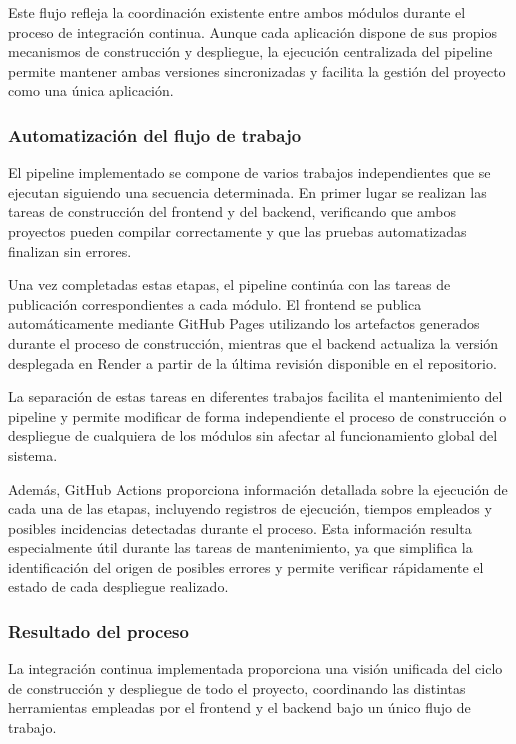 Este flujo refleja la coordinación existente entre ambos módulos durante el proceso de integración continua. Aunque cada aplicación dispone de sus propios mecanismos de construcción y despliegue, la ejecución centralizada del pipeline permite mantener ambas versiones sincronizadas y facilita la gestión del proyecto como una única aplicación.

\subsubsection{Automatización del flujo de trabajo}

El pipeline implementado se compone de varios trabajos independientes que se ejecutan siguiendo una secuencia determinada. En primer lugar se realizan las tareas de construcción del frontend y del backend, verificando que ambos proyectos pueden compilar correctamente y que las pruebas automatizadas finalizan sin errores.

Una vez completadas estas etapas, el pipeline continúa con las tareas de publicación correspondientes a cada módulo. El frontend se publica automáticamente mediante GitHub Pages utilizando los artefactos generados durante el proceso de construcción, mientras que el backend actualiza la versión desplegada en Render a partir de la última revisión disponible en el repositorio.

La separación de estas tareas en diferentes trabajos facilita el mantenimiento del pipeline y permite modificar de forma independiente el proceso de construcción o despliegue de cualquiera de los módulos sin afectar al funcionamiento global del sistema.

Además, GitHub Actions proporciona información detallada sobre la ejecución de cada una de las etapas, incluyendo registros de ejecución, tiempos empleados y posibles incidencias detectadas durante el proceso. Esta información resulta especialmente útil durante las tareas de mantenimiento, ya que simplifica la identificación del origen de posibles errores y permite verificar rápidamente el estado de cada despliegue realizado.

\subsubsection{Resultado del proceso}

La integración continua implementada proporciona una visión unificada del ciclo de construcción y despliegue de todo el proyecto, coordinando las distintas herramientas empleadas por el frontend y el backend bajo un único flujo de trabajo.

